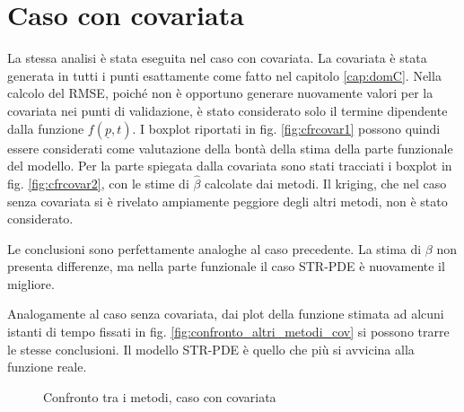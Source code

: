 \documentclass[a4paper,11pt,twoside,openright]{book}							%
\begin{document}
\section{Caso con covariata}

La stessa analisi è stata eseguita nel caso con covariata. La covariata è stata generata in tutti i punti esattamente come fatto nel capitolo \ref{cap:domC}. Nella calcolo del RMSE, poiché non è opportuno generare nuovamente valori per la covariata nei punti di validazione, è stato considerato solo il termine dipendente dalla funzione $f(\underline p,t)$. I boxplot riportati in fig. \ref{fig:cfrcovar1} possono quindi essere considerati come valutazione della bontà della stima della parte funzionale del modello. Per la parte spiegata dalla covariata sono stati tracciati i boxplot in fig. \ref{fig:cfrcovar2}, con le stime di $\hat{\beta}$ calcolate dai metodi. Il kriging, che nel caso senza covariata si è rivelato ampiamente peggiore degli altri metodi, non è stato considerato.

Le conclusioni sono perfettamente analoghe al caso precedente. La stima di $\beta$ non presenta differenze, ma nella parte funzionale il caso STR-PDE è nuovamente il migliore.

Analogamente al caso senza covariata, dai plot della funzione stimata ad alcuni istanti di tempo fissati in fig. \ref{fig:confronto_altri_metodi_cov} si possono trarre le stesse conclusioni. Il modello STR-PDE è quello che più si avvicina alla funzione reale.

\begin{figure}[t]
	\centering
	\caption{Confronto tra i metodi, caso con covariata}
	\label{fig:cfrcovar}
\end{figure}
\end{document}

